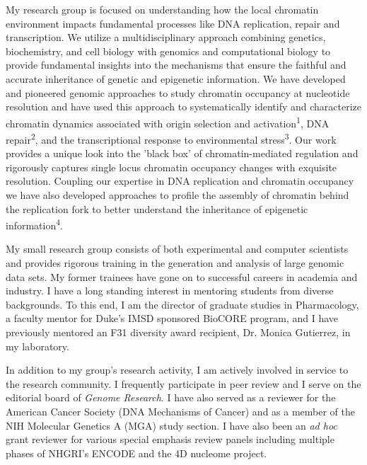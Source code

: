 \documentclass{nihbiosketch}
\begin{document}
\begin{statement}
\addtolength{\parskip}{1.5mm}
\noindent My research group is focused on understanding how the local chromatin environment impacts fundamental processes like DNA replication, repair and transcription. We utilize a multidisciplinary approach combining genetics, biochemistry, and cell biology with genomics and computational biology to provide fundamental insights into the mechanisms that ensure the faithful and accurate inheritance of genetic and epigenetic information.  We have developed and pioneered genomic approaches to study chromatin occupancy at nucleotide resolution and have used this approach to systematically identify and characterize chromatin dynamics associated with origin selection and activation\textsuperscript{1}, DNA repair\textsuperscript{2}, and the transcriptional response to environmental stress\textsuperscript{3}.  Our work provides a unique look into the 'black box' of chromatin-mediated regulation and rigorously captures single locus chromatin occupancy changes with exquisite resolution.  Coupling our expertise in DNA replication and chromatin occupancy we have also developed approaches to profile the assembly of chromatin behind the replication fork to better understand the inheritance of epigenetic information\textsuperscript{4}.  

\noindent My small research group consists of both experimental and computer scientists and provides rigorous training in the generation and analysis of large genomic data sets. My former trainees have gone on to successful careers in academia and industry.  I have a long standing interest in mentoring students from diverse backgrounds.  To this end, I am the director of graduate studies in Pharmacology, a faculty mentor for Duke's IMSD sponsored BioCORE program, and I have previously mentored an F31 diversity award recipient, Dr. Monica Gutierrez, in my laboratory.

\noindent In addition to my group's research activity, I am actively involved in service to the research community.  I frequently participate in peer review and I serve on the editorial board of \textit{Genome Research}.  I have also served as a reviewer for the American Cancer Society (DNA Mechanisms of Cancer) and as a member of the NIH Molecular Genetics A (MGA) study section.  I have also been an \textit{ad hoc} grant reviewer for various special emphasis review panels including multiple phases of NHGRI's ENCODE and the 4D nucleome project. 


\begin{enumerate}


\end{enumerate}
\end{statement}
\end{document}
